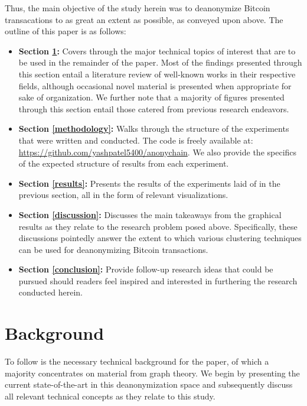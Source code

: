 \documentclass{article}
\begin{document}
Thus, the main objective of the study herein was to deanonymize Bitcoin transacations to as great an extent as possible, as conveyed upon above. The outline of this paper is as follows:
\begin{itemize}
    \item \textbf{Section \ref{background}:} Covers through the major technical topics of interest that are to be used in the remainder of the paper. Most of the findings presented through this section entail a literature review of well-known works in their respective fields, although occasional novel material is presented when appropriate for sake of organization. We further note that a majority of figures presented through this section entail those catered from previous research endeavors.
    \item \textbf{Section \ref{methodology}:} Walks through the structure of the experiments that were written and conducted. The code is freely available at: \url{https://github.com/yashpatel5400/anonychain}. We also provide the specifics of the expected structure of results from each experiment.
    \item \textbf{Section \ref{results}:} Presents the results of the experiments laid of in the previous section, all in the form of relevant visualizations.
    \item \textbf{Section \ref{discussion}:} Discusses the main takeaways from the graphical results as they relate to the research problem posed above. Specifically, these discussions pointedly answer the extent to which various clustering techniques can be used for deanonymizing Bitcoin transactions.
    \item \textbf{Section \ref{conclusion}:} Provide follow-up research ideas that could be pursued should readers feel inspired and interested in furthering the research conducted herein.
\end{itemize}

\clearpage
\section{Background}\label{background}
To follow is the necessary technical background for the paper, of which a majority concentrates on material from graph theory. We begin by presenting the current state-of-the-art in this deanonymization space and subsequently discuss all relevant technical concepts as they relate to this study. 
\end{document}
